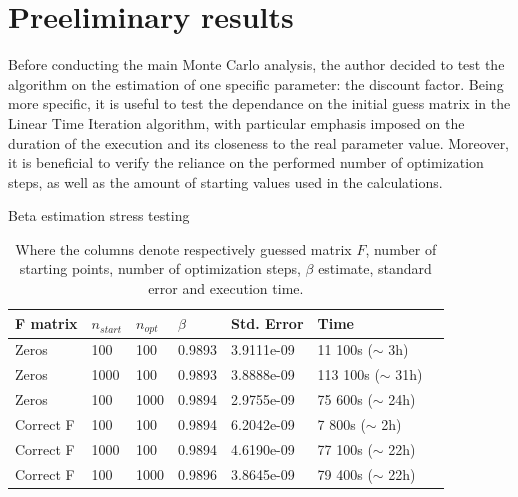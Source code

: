 \documentclass{pracamgr}
\numberwithin{equation}{section}
\begin{document}
\section{Preeliminary results}

Before conducting the main Monte Carlo analysis, the author decided to test the algorithm on the estimation of one specific parameter: the discount factor. Being more specific, it is useful to test the dependance on the initial guess matrix in the Linear Time Iteration algorithm, with particular emphasis imposed on the duration of the execution and its closeness to the real parameter value. Moreover, it is beneficial to verify the reliance on the performed number of optimization steps, as well as the amount of starting values used in the calculations. 

\begin{table}[!htbp] \label{Beta_stress}
\centering
\caption{Beta estimation stress testing}
\begin{tabularx}{\textwidth}{@{} M *{3}{Y} M M L  @{}}
\toprule
F matrix & $n_{start}$ & $n_{opt}$ & $\beta$ & Std. Error & Time
\\ \midrule
Zeros              & 100                          & 100                       &     0.9893     &           3.9111e-09                         &                                          11 100s  ($\sim$ 3h)       \\
Zeros              & 1000                         & 100       &    0.9893            &                           3.8888e-09                   &                                    113 100s  ($\sim$ 31h)     \\
Zeros              & 100                          & 1000                      &   0.9894       &               2.9755e-09                     &                     75 600s    ($\sim$ 24h)                          \\
Correct F          & 100                          & 100                       &     0.9894     &         6.2042e-09                           &                              7 800s         ($\sim$ 2h)               \\
Correct F          & 1000                         & 100                       &     0.9894     &                 4.6190e-09                   &                                  77 100s          ($\sim$ 22h)           \\
Correct F          & 100                          & 1000                      &        0.9896  &           3.8645e-09                            &                                                79 400s ($\sim$ 22h)                   \\ \bottomrule
\end{tabularx}
\caption*{\small{Where the columns denote respectively guessed matrix $F$, number of starting points, number of optimization steps, $\beta$ estimate, standard error and execution time.}}
\end{table}
\end{document}
